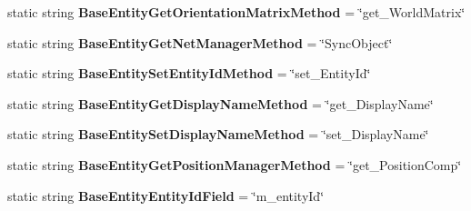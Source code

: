\begin{DoxyCompactItemize}
\item 
\hypertarget{class_s_e_mod_a_p_i_internal_1_1_a_p_i_1_1_entity_1_1_base_entity_a64352a689eb9630f1ed8a618f2e4a638}{}static string {\bfseries Base\+Entity\+Get\+Orientation\+Matrix\+Method} = \char`\"{}get\+\_\+\+World\+Matrix\char`\"{}\label{class_s_e_mod_a_p_i_internal_1_1_a_p_i_1_1_entity_1_1_base_entity_a64352a689eb9630f1ed8a618f2e4a638}

\item 
\hypertarget{class_s_e_mod_a_p_i_internal_1_1_a_p_i_1_1_entity_1_1_base_entity_aa0cfd992b2690d17abc20a2d1e89b01d}{}static string {\bfseries Base\+Entity\+Get\+Net\+Manager\+Method} = \char`\"{}Sync\+Object\char`\"{}\label{class_s_e_mod_a_p_i_internal_1_1_a_p_i_1_1_entity_1_1_base_entity_aa0cfd992b2690d17abc20a2d1e89b01d}

\item 
\hypertarget{class_s_e_mod_a_p_i_internal_1_1_a_p_i_1_1_entity_1_1_base_entity_ab2979e2e9e05a1940af64d0fabce88f0}{}static string {\bfseries Base\+Entity\+Set\+Entity\+Id\+Method} = \char`\"{}set\+\_\+\+Entity\+Id\char`\"{}\label{class_s_e_mod_a_p_i_internal_1_1_a_p_i_1_1_entity_1_1_base_entity_ab2979e2e9e05a1940af64d0fabce88f0}

\item 
\hypertarget{class_s_e_mod_a_p_i_internal_1_1_a_p_i_1_1_entity_1_1_base_entity_ae4daca951c11913237b400d6eb2dbf1d}{}static string {\bfseries Base\+Entity\+Get\+Display\+Name\+Method} = \char`\"{}get\+\_\+\+Display\+Name\char`\"{}\label{class_s_e_mod_a_p_i_internal_1_1_a_p_i_1_1_entity_1_1_base_entity_ae4daca951c11913237b400d6eb2dbf1d}

\item 
\hypertarget{class_s_e_mod_a_p_i_internal_1_1_a_p_i_1_1_entity_1_1_base_entity_a24971fd94d708b197aebc838ed8d3c9f}{}static string {\bfseries Base\+Entity\+Set\+Display\+Name\+Method} = \char`\"{}set\+\_\+\+Display\+Name\char`\"{}\label{class_s_e_mod_a_p_i_internal_1_1_a_p_i_1_1_entity_1_1_base_entity_a24971fd94d708b197aebc838ed8d3c9f}

\item 
\hypertarget{class_s_e_mod_a_p_i_internal_1_1_a_p_i_1_1_entity_1_1_base_entity_a34aee85052f3b7afee065ae1beff5b5e}{}static string {\bfseries Base\+Entity\+Get\+Position\+Manager\+Method} = \char`\"{}get\+\_\+\+Position\+Comp\char`\"{}\label{class_s_e_mod_a_p_i_internal_1_1_a_p_i_1_1_entity_1_1_base_entity_a34aee85052f3b7afee065ae1beff5b5e}

\item 
\hypertarget{class_s_e_mod_a_p_i_internal_1_1_a_p_i_1_1_entity_1_1_base_entity_abf54885ac44a77f5b1cd61e6c2d1dcd6}{}static string {\bfseries Base\+Entity\+Entity\+Id\+Field} = \char`\"{}m\+\_\+entity\+Id\char`\"{}\label{class_s_e_mod_a_p_i_internal_1_1_a_p_i_1_1_entity_1_1_base_entity_abf54885ac44a77f5b1cd61e6c2d1dcd6}


\end{DoxyCompactItemize}
